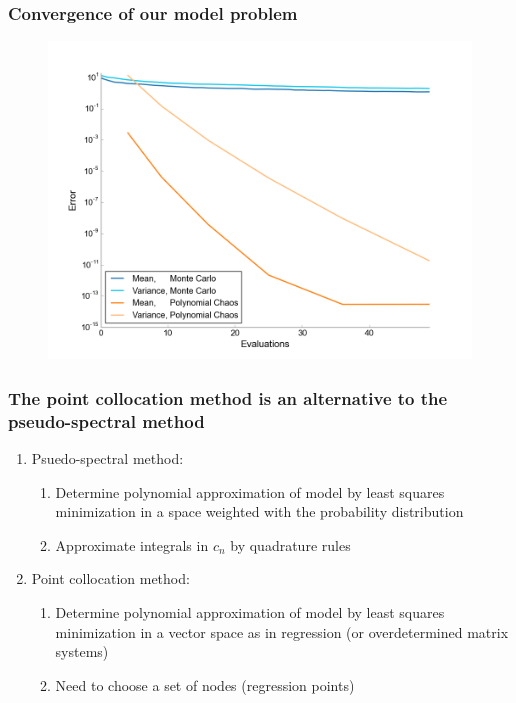 \documentclass[handout]{beamer}
\begin{document}
\begin{frame}
 \frametitle{Convergence of our model problem}

\begin{figure}
    \includegraphics[width=1\textwidth]{MC-PC_convergence_2D.png}
  \end{figure}

 \end{frame}



 \begin{frame}
  \frametitle{The point collocation method is an alternative to the
  pseudo-spectral method}

\begin{enumerate}[<+->]
\item Psuedo-spectral method:
\begin{enumerate}[<+->]
\item Determine polynomial approximation of model by least squares
minimization in a space weighted with the probability distribution
\vspace{1mm}
\item Approximate integrals in $c_n$ by quadrature rules
\end{enumerate}
\vspace{5mm}
\item Point collocation method:
\begin{enumerate}[<+->]
\item Determine polynomial approximation of model by least squares
minimization in a vector space as in regression (or overdetermined matrix systems)
\vspace{1mm}
\item Need to choose a set of nodes (regression points)
\end{enumerate}
\end{enumerate}
\end{frame}
\end{document}
